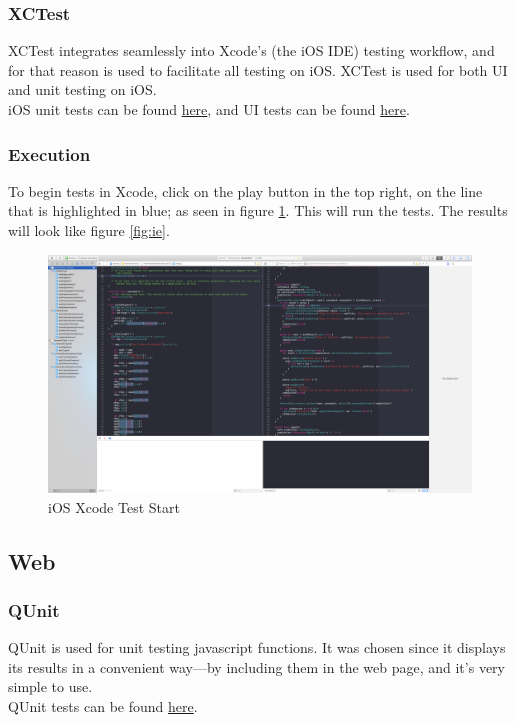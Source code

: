\documentclass[12pt]{article}
\begin{document}
\subsubsection{XCTest}
XCTest integrates seamlessly into Xcode's (the iOS IDE) testing workflow, and for that reason is used to facilitate all testing on iOS. XCTest is used for both UI and unit testing on iOS.\\
\indent iOS unit tests can be found \href{https://github.com/BinaryNinjaz/COS301-Capstone/tree/master/Source/iOS/Harvest/HarvestTests}{here}, and UI tests can be found \href{https://github.com/BinaryNinjaz/COS301-Capstone/tree/master/Source/iOS/Harvest/HarvestUITests}{here}.
\subsubsection{Execution}
To begin tests in Xcode, click on the play button in the top right, on the line that is highlighted in blue; as seen in figure \ref{fig:is}. This will run the tests. The results will look like figure \ref{fig:ie}.
\begin{center}
  \begin{figure}
	\label{fig:is}
  	\includegraphics[width=\textwidth]{images/iOS-test.png}
	\caption{iOS Xcode Test Start}
  \end{figure}
\end{center}

\subsection{Web}
\subsubsection{QUnit}
QUnit is used for unit testing javascript functions. It was chosen since it displays its results in a convenient way---by including them in the web page, and it's very simple to use.\\
\indent QUnit tests can be found \href{https://github.com/BinaryNinjaz/COS301-Capstone/tree/master/Source/Web/app}{here}.
\end{document}
